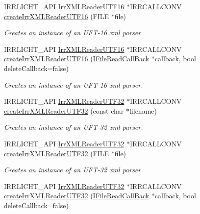 \begin{DoxyCompactItemize}
I\+R\+R\+L\+I\+C\+H\+T\+\_\+\+A\+PI \hyperlink{namespaceirr_1_1io_a5eb4094dfd0d509e0cd8a9d1dd30a5b9}{Irr\+X\+M\+L\+Reader\+U\+T\+F16} $\ast$I\+R\+R\+C\+A\+L\+L\+C\+O\+NV \hyperlink{namespaceirr_1_1io_a7e7ecf8350b446da3a4080f3949bc0b1}{create\+Irr\+X\+M\+L\+Reader\+U\+T\+F16} (F\+I\+LE $\ast$file)
\begin{DoxyCompactList}\small\item\em Creates an instance of an U\+F\+T-\/16 xml parser. \end{DoxyCompactList}\item 
I\+R\+R\+L\+I\+C\+H\+T\+\_\+\+A\+PI \hyperlink{namespaceirr_1_1io_a5eb4094dfd0d509e0cd8a9d1dd30a5b9}{Irr\+X\+M\+L\+Reader\+U\+T\+F16} $\ast$I\+R\+R\+C\+A\+L\+L\+C\+O\+NV \hyperlink{namespaceirr_1_1io_a9248bcaf5d5f394d7926c28bfc479d6c}{create\+Irr\+X\+M\+L\+Reader\+U\+T\+F16} (\hyperlink{classirr_1_1io_1_1IFileReadCallBack}{I\+File\+Read\+Call\+Back} $\ast$callback, bool delete\+Callback=false)
\begin{DoxyCompactList}\small\item\em Creates an instance of an U\+F\+T-\/16 xml parser. \end{DoxyCompactList}\item 
I\+R\+R\+L\+I\+C\+H\+T\+\_\+\+A\+PI \hyperlink{namespaceirr_1_1io_a70f411ff403636fb5c4e9becb090d5ec}{Irr\+X\+M\+L\+Reader\+U\+T\+F32} $\ast$I\+R\+R\+C\+A\+L\+L\+C\+O\+NV \hyperlink{namespaceirr_1_1io_ae05bf7ee342431ea8c98fb98e75b974a}{create\+Irr\+X\+M\+L\+Reader\+U\+T\+F32} (const char $\ast$filename)
\begin{DoxyCompactList}\small\item\em Creates an instance of an U\+F\+T-\/32 xml parser. \end{DoxyCompactList}\item 
I\+R\+R\+L\+I\+C\+H\+T\+\_\+\+A\+PI \hyperlink{namespaceirr_1_1io_a70f411ff403636fb5c4e9becb090d5ec}{Irr\+X\+M\+L\+Reader\+U\+T\+F32} $\ast$I\+R\+R\+C\+A\+L\+L\+C\+O\+NV \hyperlink{namespaceirr_1_1io_a4ea88dd2598272cff85357611a5e5938}{create\+Irr\+X\+M\+L\+Reader\+U\+T\+F32} (F\+I\+LE $\ast$file)
\begin{DoxyCompactList}\small\item\em Creates an instance of an U\+F\+T-\/32 xml parser. \end{DoxyCompactList}\item 
I\+R\+R\+L\+I\+C\+H\+T\+\_\+\+A\+PI \hyperlink{namespaceirr_1_1io_a70f411ff403636fb5c4e9becb090d5ec}{Irr\+X\+M\+L\+Reader\+U\+T\+F32} $\ast$I\+R\+R\+C\+A\+L\+L\+C\+O\+NV \hyperlink{namespaceirr_1_1io_a0f6ab4835641471a523c485c8d229eb2}{create\+Irr\+X\+M\+L\+Reader\+U\+T\+F32} (\hyperlink{classirr_1_1io_1_1IFileReadCallBack}{I\+File\+Read\+Call\+Back} $\ast$callback, bool delete\+Callback=false)

\end{DoxyCompactItemize}

